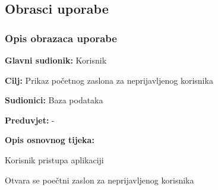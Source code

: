 			\eject 
			
			
				
			\subsection{Obrasci uporabe}
		
				\subsubsection{Opis obrazaca uporabe}
				
					\noindent {}
					\begin{packed_item}
						
						\item \textbf{Glavni sudionik: }Korisnik
						\item  \textbf{Cilj:} Prikaz početnog zaslona za neprijavljenog korisnika
						\item  \textbf{Sudionici:} Baza podataka
						\item  \textbf{Preduvjet:} -
						\item  \textbf{Opis osnovnog tijeka:}
						
						\item[] \begin{packed_enum}
							
							\item Korisnik pristupa aplikaciji
							\item Otvara se poečtni zaslon za neprijavljenog korisnika
						\end{packed_enum}
					\end{packed_item}
					
